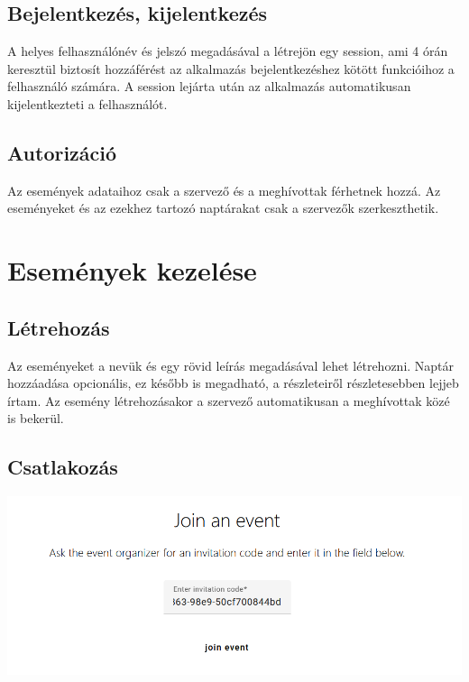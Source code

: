 \documentclass[a4paper,12pt]{report}
\theoremstyle{definition}
\theoremstyle{remark}
\begin{document}
	\subsection{Bejelentkezés, kijelentkezés}

A helyes felhasználónév és jelszó megadásával a létrejön egy session, ami 4 órán keresztül biztosít hozzáférést az alkalmazás bejelentkezéshez kötött funkcióihoz a felhasználó számára. A session lejárta után az alkalmazás automatikusan kijelentkezteti a felhasználót.

	\subsection{Autorizáció}

Az események adataihoz csak a szervező és a meghívottak férhetnek hozzá. Az eseményeket és az ezekhez tartozó naptárakat csak a szervezők szerkeszthetik.

\section{Események kezelése}

	\subsection{Létrehozás}

Az eseményeket a nevük és egy rövid leírás megadásával lehet létrehozni. Naptár hozzáadása opcionális, ez később is megadható, a részleteiről részletesebben lejjeb írtam.  Az esemény létrehozásakor a szervező automatikusan a meghívottak közé is bekerül.

	\subsection{Csatlakozás}

\begin{center}
\includegraphics[width=150mm]{join_event}
\captionsetup{width=0.8\linewidth}
\label{join_event}
\end{center}
\end{document}
